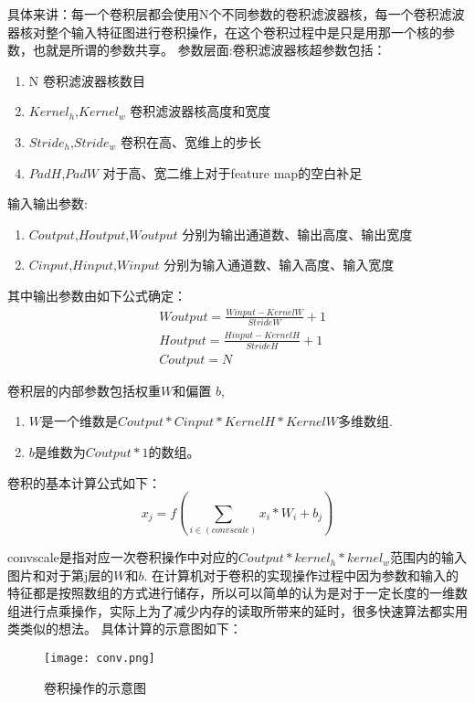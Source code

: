 具体来讲：每一个卷积层都会使用N个不同参数的卷积滤波器核，每一个卷积滤波器核对整个输入特征图进行卷积操作，在这个卷积过程中是只是用那一个核的参数，也就是所谓的参数共享。 
参数层面:卷积滤波器核超参数包括：
\begin{enumerate}
\item N 卷积滤波器核数目
\item $Kernel_h$,$Kernel_w$ 卷积滤波器核高度和宽度
\item $Stride_h$,$Stride_w$ 卷积在高、宽维上的步长
\item $PadH$,$PadW$ 对于高、宽二维上对于feature map的空白补足
\end{enumerate}
输入输出参数:\begin{enumerate}
\item $Coutput$,$Houtput$,$Woutput$ 分别为输出通道数、输出高度、输出宽度
\item $Cinput$,$Hinput$,$Winput$    分别为输入通道数、输入高度、输入宽度
\end{enumerate}
其中输出参数由如下公式确定：
\begin{equation}{
\begin{split}
 & Woutput= \frac{Winput-KernelW}{StrideW} +1 \\
 & Houtput= \frac{Hinput-KernelH}{StrideH} +1 \\
 & Coutput= N
\end{split}
}\end{equation}

卷积层的内部参数包括权重$W$和偏置 $b$,
\begin{enumerate}
\item $W$是一个维数是$ Coutput*Cinput*KernelH*KernelW $多维数组.
\item $b$是维数为$Coutput*1$的数组。
\end{enumerate}

卷积的基本计算公式如下： 
\begin{equation}{
 x_j=f(\sum_{i\in (convscale) }x_i*W_i+b_j ) 
}
\end{equation}

convscale是指对应一次卷积操作中对应的$Coutput*kernel_h*kernel_w$范围内的输入图片和对于第j层的$W$和$b$.
在计算机对于卷积的实现操作过程中因为参数和输入的特征都是按照数组的方式进行储存，所以可以简单的认为是对于一定长度的一维数组进行点乘操作，实际上为了减少内存的读取所带来的延时，很多快速算法都实用类类似的想法。 具体计算的示意图如下：
\begin{figure}[!ht]
 \centering
	\texttt{[image: conv.png]}
	\caption{卷积操作的示意图}
\end{figure}

